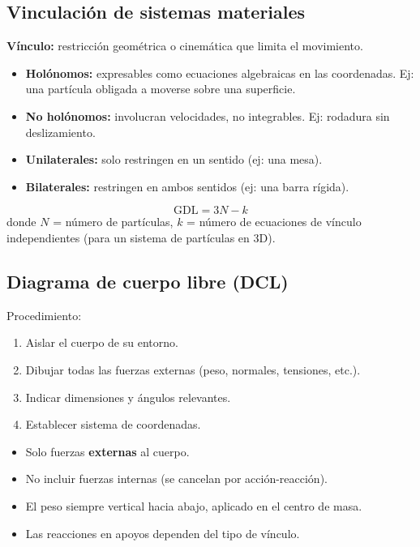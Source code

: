 \documentclass[12pt,a4paper]{article}
\begin{document}
\subsection{Vinculación de sistemas materiales}

\textbf{Vínculo:} restricción geométrica o cinemática que limita el movimiento.

\begin{itemize}
    \item \textbf{Holónomos:} expresables como ecuaciones algebraicas en las coordenadas.
          Ej: una partícula obligada a moverse sobre una superficie.
    \item \textbf{No holónomos:} involucran velocidades, no integrables.
          Ej: rodadura sin deslizamiento.
    \item \textbf{Unilaterales:} solo restringen en un sentido (ej: una mesa).
    \item \textbf{Bilaterales:} restringen en ambos sentidos (ej: una barra rígida).
\end{itemize}

\begin{formbox}
\[
\text{GDL} = 3N - k
\]
donde $N$ = número de partículas, $k$ = número de ecuaciones de vínculo
independientes (para un sistema de partículas en 3D).
\end{formbox}

\subsection{Diagrama de cuerpo libre (DCL)}

Procedimiento:
\begin{enumerate}
    \item Aislar el cuerpo de su entorno.
    \item Dibujar todas las fuerzas externas (peso, normales, tensiones, etc.).
    \item Indicar dimensiones y ángulos relevantes.
    \item Establecer sistema de coordenadas.
\end{enumerate}

\begin{tipbox}
\begin{itemize}
    \item Solo fuerzas \textbf{externas} al cuerpo.
    \item No incluir fuerzas internas (se cancelan por acción-reacción).
    \item El peso siempre vertical hacia abajo, aplicado en el centro de masa.
    \item Las reacciones en apoyos dependen del tipo de vínculo.
\end{itemize}
\end{tipbox}
\end{document}

